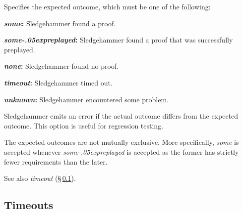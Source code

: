\documentclass[a4paper,12pt]{article}
\let\oldS=\S
\def\S{\oldS\,}
\renewcommand\_{\hbox{\textunderscore\kern-.05ex}}
\begin{document}
\begin{enum}
Specifies the expected outcome, which must be one of the following:

\begin{enum}
\item[\labelitemi] \textbf{\textit{some}:} Sledgehammer found a proof.
\item[\labelitemi] \textbf{\textit{some\_preplayed}:} Sledgehammer found a proof that was successfully preplayed.
\item[\labelitemi] \textbf{\textit{none}:} Sledgehammer found no proof.
\item[\labelitemi] \textbf{\textit{timeout}:} Sledgehammer timed out.
\item[\labelitemi] \textbf{\textit{unknown}:} Sledgehammer encountered some
problem.
\end{enum}

Sledgehammer emits an error if the actual outcome differs from the expected outcome. This option is
useful for regression testing.

The expected outcomes are not mutually exclusive. More specifically, \textit{some} is accepted
whenever \textit{some\_preplayed} is accepted as the former has strictly fewer requirements
than the later.

\nopagebreak
{\small See also \textit{timeout} (\S\ref{timeouts}).}
\end{enum}


\subsection{Timeouts}
\label{timeouts}
\end{document}

